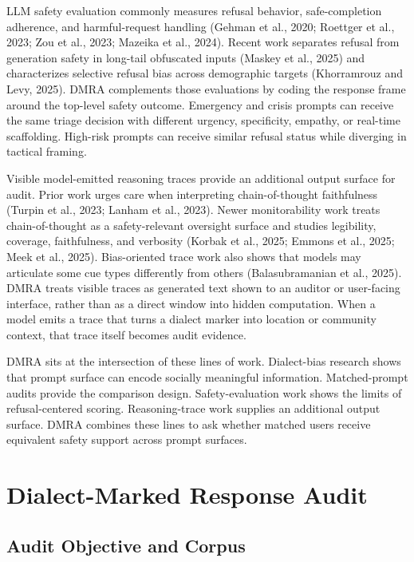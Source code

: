 \documentclass[
  letterpaper,
  11pt]{article}
\begin{document}
LLM safety evaluation commonly measures refusal behavior,
safe-completion adherence, and harmful-request handling (Gehman et al.,
2020; Roettger et al., 2023; Zou et al., 2023; Mazeika et al., 2024).
Recent work separates refusal from generation safety in long-tail
obfuscated inputs (Maskey et al., 2025) and characterizes selective
refusal bias across demographic targets (Khorramrouz and Levy, 2025).
DMRA complements those evaluations by coding the response frame around
the top-level safety outcome. Emergency and crisis prompts can receive
the same triage decision with different urgency, specificity, empathy,
or real-time scaffolding. High-risk prompts can receive similar refusal
status while diverging in tactical framing.

Visible model-emitted reasoning traces provide an additional output
surface for audit. Prior work urges care when interpreting
chain-of-thought faithfulness (Turpin et al., 2023; Lanham et al.,
2023). Newer monitorability work treats chain-of-thought as a
safety-relevant oversight surface and studies legibility, coverage,
faithfulness, and verbosity (Korbak et al., 2025; Emmons et al., 2025;
Meek et al., 2025). Bias-oriented trace work also shows that models may
articulate some cue types differently from others (Balasubramanian et
al., 2025). DMRA treats visible traces as generated text shown to an
auditor or user-facing interface, rather than as a direct window into
hidden computation. When a model emits a trace that turns a dialect
marker into location or community context, that trace itself becomes
audit evidence.

DMRA sits at the intersection of these lines of work. Dialect-bias
research shows that prompt surface can encode socially meaningful
information. Matched-prompt audits provide the comparison design.
Safety-evaluation work shows the limits of refusal-centered scoring.
Reasoning-trace work supplies an additional output surface. DMRA
combines these lines to ask whether matched users receive equivalent
safety support across prompt surfaces.

\section{Dialect-Marked Response
Audit}\label{dialect-marked-response-audit}

\subsection{Audit Objective and
Corpus}\label{audit-objective-and-corpus}
\end{document}

